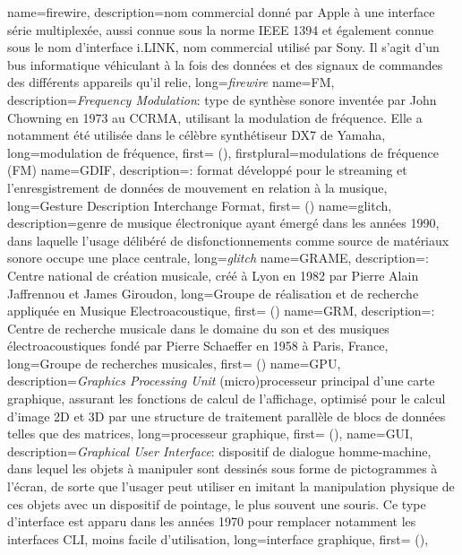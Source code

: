 {
    name={firewire},
    description={nom commercial donné par Apple à une interface série multiplexée, aussi connue sous la norme IEEE 1394 et également connue sous le nom d'interface i.LINK, nom commercial utilisé par Sony. Il s'agit d'un bus informatique véhiculant à la fois des données et des signaux de commandes des différents appareils qu'il relie},
    long={\textit{firewire}}
}
{
    name={FM},
    description={\textit{Frequency Modulation}: type de synthèse sonore inventée par John Chowning en 1973 au \gls{CCRMA}, utilisant la modulation de fréquence. Elle a notamment été utilisée dans le célèbre synthétiseur DX7 de Yamaha},
    long={modulation de fréquence},
    first={ ()},
    firstplural={modulations de fréquence (FM)}
}
{
    name={GDIF},
    description={\textit{}: format développé pour le streaming et l'enresgistrement de données de mouvement en relation à la musique},
    long={Gesture Description Interchange Format},
    first={} ()
}
{
    name={glitch},
    description={genre de musique électronique ayant émergé dans les années 1990, dans laquelle l'usage délibéré de disfonctionnements comme source de matériaux sonore occupe une place centrale},
    long={\textit{glitch}}
}
{
    name={GRAME},
    description={\textit{}: Centre national de création musicale, créé à Lyon en 1982 par Pierre Alain Jaffrennou et James Giroudon},
    long={Groupe de réalisation et de recherche appliquée en Musique Electroacoustique},
    first={} ()
}
{
    name={GRM},
    description={\textit{}: Centre de recherche musicale dans le domaine du son et des musiques électroacoustiques fondé par Pierre Schaeffer en 1958 à Paris, France},
    long={Groupe de recherches musicales},
    first={} ()
}
{
    name={GPU},
    description={\textit{Graphics Processing Unit} (micro)processeur principal d'une carte graphique, assurant les fonctions de calcul de l'affichage, optimisé pour le calcul d'image 2D et 3D par une structure de traitement parallèle de blocs de données telles que des matrices},
    long={processeur graphique},
    first={} (),
}
{
    name={GUI},
    description={\textit{Graphical User Interface}: dispositif de dialogue homme-machine, dans lequel les objets à manipuler sont dessinés sous forme de pictogrammes à l'écran, de sorte que l'usager peut utiliser en imitant la manipulation physique de ces objets avec un dispositif de pointage, le plus souvent une souris. Ce type d'interface est apparu dans les années 1970 pour remplacer notamment les interfaces \gls{CLI}, moins facile d'utilisation},
    long={interface graphique},
    first={} (),
}
